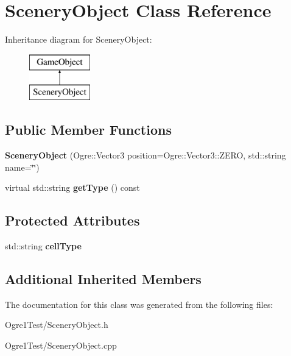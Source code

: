 \hypertarget{class_scenery_object}{}\section{Scenery\+Object Class Reference}
\label{class_scenery_object}
Inheritance diagram for Scenery\+Object\+:\begin{figure}[H]
\begin{center}
\leavevmode
\includegraphics[height=2.000000cm]{class_scenery_object}
\end{center}
\end{figure}
\subsection*{Public Member Functions}
\begin{DoxyCompactItemize}
\item 
{\bfseries Scenery\+Object} (Ogre\+::\+Vector3 position=Ogre\+::\+Vector3\+::\+Z\+E\+RO, std\+::string name=\char`\"{}\char`\"{})\hypertarget{class_scenery_object_a7ae419dbf6f0eb7c9f6f7445f92ea3f9}{}\label{class_scenery_object_a7ae419dbf6f0eb7c9f6f7445f92ea3f9}

\item 
virtual std\+::string {\bfseries get\+Type} () const \hypertarget{class_scenery_object_a9339f8d09eaf0584e591462f50e16cae}{}\label{class_scenery_object_a9339f8d09eaf0584e591462f50e16cae}

\end{DoxyCompactItemize}
\subsection*{Protected Attributes}
\begin{DoxyCompactItemize}
\item 
std\+::string {\bfseries cell\+Type}\hypertarget{class_scenery_object_aa75b4922c9fbceb766193e4b26a4f29c}{}\label{class_scenery_object_aa75b4922c9fbceb766193e4b26a4f29c}

\end{DoxyCompactItemize}
\subsection*{Additional Inherited Members}


The documentation for this class was generated from the following files\+:\begin{DoxyCompactItemize}
\item 
Ogre1\+Test/Scenery\+Object.\+h\item 
Ogre1\+Test/Scenery\+Object.\+cpp\end{DoxyCompactItemize}
